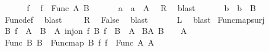 \begin{isabellebody}
\ \ \isamarkupfalse%
\isanewline
\ \ \isacommand{{\isacharbraceleft}{\kern0pt}}\isamarkupfalse%
\isamarkupfalse%
\ f\ \isamarkupfalse%
\ {\isachardoublequoteopen}f\ {\isasymin}\ Func\ A\ B{\isachardoublequoteclose}\isanewline
\ \ \ \isamarkupfalse%
\ \isamarkupfalse%
\ a\ \ {\isachardoublequoteopen}a\ {\isasymin}\ A{\isachardoublequoteclose}\ \isamarkupfalse%
\ R\ \isamarkupfalse%
\ blast\isanewline
\ \ \ \isamarkupfalse%
\ \isamarkupfalse%
\ b\ \ {\isachardoublequoteopen}b\ {\isasymin}\ B{\isachardoublequoteclose}\ \isamarkupfalse%
\ Func{\isacharunderscore}{\kern0pt}def\ \isamarkupfalse%
\ blast\isanewline
\ \ \ \isamarkupfalse%
\ R\ \isamarkupfalse%
\ False\ \isamarkupfalse%
\ blast\isanewline
\ \ \isacommand{{\isacharbraceright}{\kern0pt}}\isamarkupfalse%
\isanewline
\ \ \isamarkupfalse%
\ {\isacharquery}{\kern0pt}L\ \isamarkupfalse%
\ blast\isanewline
{}\isamarkupfalse%
%
\endisatagproof
{\isafoldproof}%
%
\isadelimproof
\isanewline
%
\endisadelimproof
\isanewline
{}\isamarkupfalse%
\ Func{\isacharunderscore}{\kern0pt}map{\isacharunderscore}{\kern0pt}surj{\isacharcolon}{\kern0pt}\isanewline
{}\ B{}{\isacharcolon}{\kern0pt}\ {\isachardoublequoteopen}f{}\ {\isacharbackquote}{\kern0pt}\ A{}\ {\isacharequal}{\kern0pt}\ B{}{\isachardoublequoteclose}\ \ A{}{\isacharcolon}{\kern0pt}\ {\isachardoublequoteopen}inj{\isacharunderscore}{\kern0pt}on\ f{}\ B{}{\isachardoublequoteclose}\ {\isachardoublequoteopen}f{}\ {\isacharbackquote}{\kern0pt}\ B{}\ {\isasymsubseteq}\ A{}{\isachardoublequoteclose}\isanewline
{}\ B{}A{}{\isacharcolon}{\kern0pt}\ {\isachardoublequoteopen}B{}\ {\isacharequal}{\kern0pt}\ {\isacharbraceleft}{\kern0pt}{\isacharbraceright}{\kern0pt}\ {\isasymLongrightarrow}\ A{}\ {\isacharequal}{\kern0pt}\ {\isacharbraceleft}{\kern0pt}{\isacharbraceright}{\kern0pt}{\isachardoublequoteclose}\isanewline
{}\ {\isachardoublequoteopen}Func\ B{}\ B{}\ {\isacharequal}{\kern0pt}\ Func{\isacharunderscore}{\kern0pt}map\ B{}\ f{}\ f{}\ {\isacharbackquote}{\kern0pt}\ Func\ A{}\ A{}{\isachardoublequoteclose}\isanewline

\end{isabellebody}
